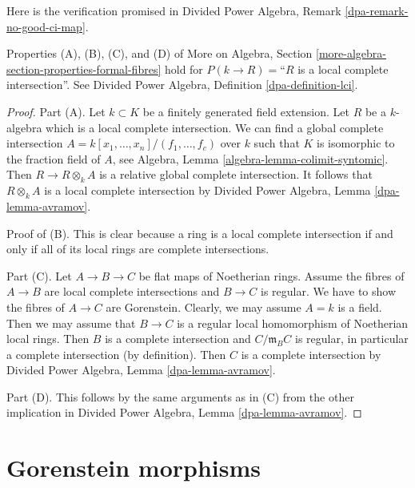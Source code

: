 \noindent
Here is the verification promised in
Divided Power Algebra, Remark \ref{dpa-remark-no-good-ci-map}.

\begin{lemma}
\label{lemma-formal-fibres-lci}
Properties (A), (B), (C), and (D) of
More on Algebra, Section \ref{more-algebra-section-properties-formal-fibres}
hold for $P(k \to R) =$``$R$ is a local complete intersection''.
See Divided Power Algebra, Definition \ref{dpa-definition-lci}.
\end{lemma}

\begin{proof}
Part (A). Let $k \subset K$ be a finitely generated field extension.
Let $R$ be a $k$-algebra which is a local complete intersection.
We can find a global complete intersection
$A = k[x_1, \ldots, x_n]/(f_1, \ldots, f_c)$
over $k$ such that $K$ is isomorphic to the fraction field of $A$, see
Algebra, Lemma \ref{algebra-lemma-colimit-syntomic}.
Then $R \to R \otimes_k A$ is a relative global complete intersection.
It follows that $R \otimes_k A$ is a local complete intersection
by Divided Power Algebra, Lemma \ref{dpa-lemma-avramov}.

\medskip\noindent
Proof of (B). This is clear
because a ring is a local complete intersection if and only if all of its
local rings are complete intersections.

\medskip\noindent
Part (C). Let $A \to B \to C$ be flat maps of Noetherian rings.
Assume the fibres of $A \to B$ are local complete intersections
and $B \to C$ is regular. We have to show the fibres of $A \to C$
are Gorenstein. Clearly, we may assume $A = k$ is a field.
Then we may assume that $B \to C$ is a regular local homomorphism
of Noetherian local rings. Then $B$ is a complete intersection and
$C/\mathfrak m_B C$ is regular, in particular a complete intersection
(by definition). Then $C$ is a complete intersection by
Divided Power Algebra, Lemma \ref{dpa-lemma-avramov}.

\medskip\noindent
Part (D). This follows by the same arguments as in (C) from
the other implication in
Divided Power Algebra, Lemma \ref{dpa-lemma-avramov}.
\end{proof}






\section{Gorenstein morphisms}
\label{section-gorenstein-morphisms}

